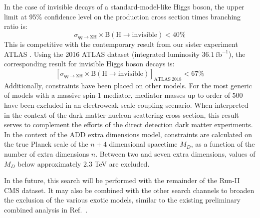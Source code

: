 In the case of invisible decays of a standard-model-like Higgs boson,
the upper limit at 95\% confidence level on the production cross section times branching ratio is:
\begin{equation*}
\sigma_{qq\rightarrow\mathrm{ZH}} \times \mathrm{B(H \rightarrow invisible)} < 40\%
\end{equation*}
This is competitive with the contemporary result from our sister experiment ATLAS \cite{Aaboud:2017bja}.
Using the 2016 ATLAS dataset (integrated luminosity $36.1~\mathrm{fb}^{-1}$), 
the corresponding result for invisible Higgs boson decays is:
\begin{equation*}
\left[\sigma_{qq\rightarrow\mathrm{ZH}} \times \mathrm{B(H \rightarrow invisible)}\right]_\mathrm{ATLAS~2018} < 67\%
\end{equation*}
Additionally, constraints have been placed on other models.
For the most generic of models with a massive spin-1 mediator,
mediator masses up to order of 500 \GeV have been excluded in an electroweak scale coupling scenario.
When interpreted in the context of the dark matter-nucleon scattering cross section,
this result serves to complement the efforts of the direct detection dark matter experiments.
In the context of the ADD extra dimensions model, constraints are calculated on the true Planck scale of the $n+4$ dimensional spacetime $M_D$, as a function of the number of extra dimensions $n$.
Between two and seven extra dimensions, values of $M_D$ below approximately 2.3 TeV are excluded.

In the future, this search will be performed with the remainder of the Run-II CMS dataset.
It may also be combined with the other search channels to broaden the exclusion
of the various exotic models, similar to the existing preliminary combined analysis
in Ref.~\cite{CMS-PAPER-HIG-16-016}.


